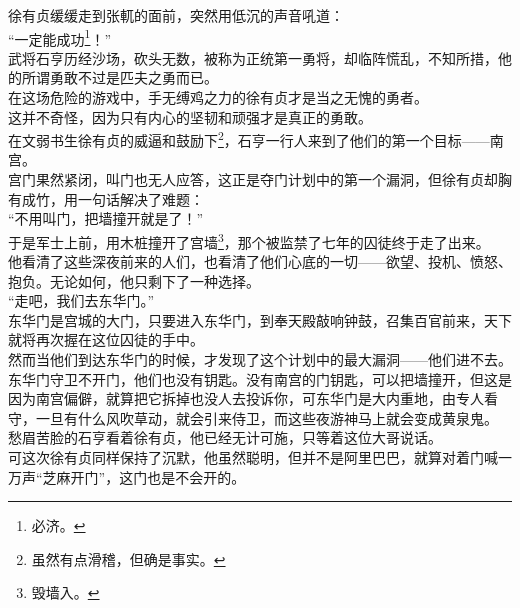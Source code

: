 \begin{multicols}{\theparacolNo}
徐有贞缓缓走到张軏的面前，突然用低沉的声音吼道：\\

“一定能成功\footnote{必济。}！”\\

武将石亨历经沙场，砍头无数，被称为正统第一勇将，却临阵慌乱，不知所措，他的所谓勇敢不过是匹夫之勇而已。\\

在这场危险的游戏中，手无缚鸡之力的徐有贞才是当之无愧的勇者。\\

这并不奇怪，因为只有内心的坚韧和顽强才是真正的勇敢。\\

在文弱书生徐有贞的威逼和鼓励下\footnote{虽然有点滑稽，但确是事实。}，石亨一行人来到了他们的第一个目标——南宫。\\

宫门果然紧闭，叫门也无人应答，这正是夺门计划中的第一个漏洞，但徐有贞却胸有成竹，用一句话解决了难题：\\

“不用叫门，把墙撞开就是了！”\\

于是军士上前，用木桩撞开了宫墙\footnote{毁墙入。}，那个被监禁了七年的囚徒终于走了出来。\\

他看清了这些深夜前来的人们，也看清了他们心底的一切——欲望、投机、愤怒、抱负。无论如何，他只剩下了一种选择。\\

“走吧，我们去东华门。”\\

东华门是宫城的大门，只要进入东华门，到奉天殿敲响钟鼓，召集百官前来，天下就将再次握在这位囚徒的手中。\\

然而当他们到达东华门的时候，才发现了这个计划中的最大漏洞——他们进不去。\\

东华门守卫不开门，他们也没有钥匙。没有南宫的门钥匙，可以把墙撞开，但这是因为南宫偏僻，就算把它拆掉也没人去投诉你，可东华门是大内重地，由专人看守，一旦有什么风吹草动，就会引来侍卫，而这些夜游神马上就会变成黄泉鬼。\\

愁眉苦脸的石亨看着徐有贞，他已经无计可施，只等着这位大哥说话。\\

可这次徐有贞同样保持了沉默，他虽然聪明，但并不是阿里巴巴，就算对着门喊一万声“芝麻开门”，这门也是不会开的。\\


\end{multicols}
